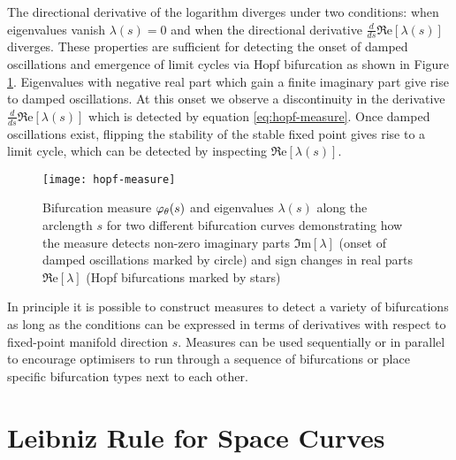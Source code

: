 The directional derivative of the logarithm diverges under two conditions: when eigenvalues vanish $\lambda(s)=0$ and when the directional derivative $\frac{d}{ds}\Re\mathrm{e}[\lambda(s)]$ diverges. These properties are sufficient for detecting the onset of damped oscillations and emergence of limit cycles via Hopf bifurcation as shown in Figure \ref{fig:hopf-measure}. Eigenvalues with negative real part which gain a finite imaginary part give rise to damped oscillations. At this onset we observe a discontinuity in the derivative $\frac{d}{ds}\Re\mathrm{e}[\lambda(s)]$ which is detected by equation \eqref{eq:hopf-measure}. Once damped oscillations exist, flipping the stability of the stable fixed point gives rise to a limit cycle, which can be detected by inspecting $\Re\mathrm{e}[\lambda(s)]$.

\begin{figure}[H]
\centering
    \texttt{[image: hopf-measure]}
    \caption{Bifurcation measure $\varphi_{\theta}(s)$ and eigenvalues $\lambda(s)$ along the arclength $s$ for two different bifurcation curves demonstrating how the measure detects non-zero imaginary parts $\Im\mathrm{m}[\lambda]$ (onset of damped oscillations marked by circle) and sign changes in real parts $\Re\mathrm{e}[\lambda]$ (Hopf bifurcations marked by stars)}
    \label{fig:hopf-measure}
\end{figure}

In principle it is possible to construct measures to detect a variety of bifurcations as long as the conditions can be expressed in terms of derivatives with respect to fixed-point manifold direction $s$. Measures can be used sequentially or in parallel to encourage optimisers to run through a sequence of bifurcations or place specific bifurcation types next to each other.

\section{Leibniz Rule for Space Curves}
\label{appendix:leibniz-rule}

